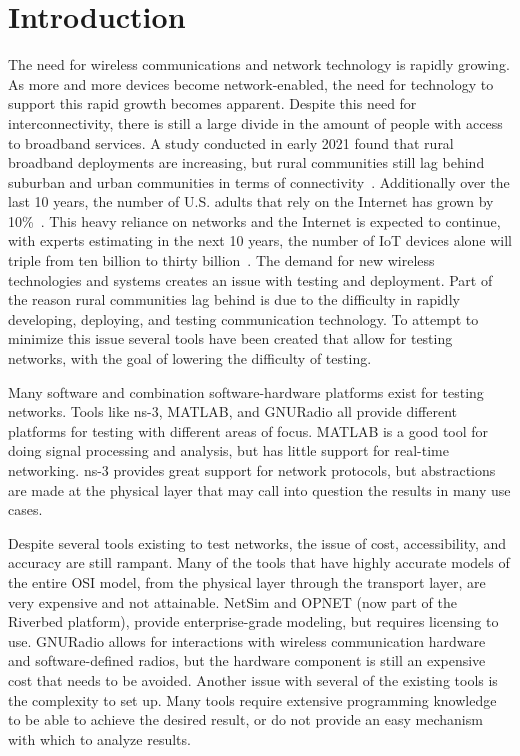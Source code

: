 \chapter{Introduction}
\label{ch:introduction}
The need for wireless communications and network technology is rapidly growing.
As more and more devices become network-enabled, the need for technology to support this rapid growth becomes apparent.
Despite this need for interconnectivity, there is still a large divide in the amount of people with access to broadband services.
A study conducted in early 2021 found that rural broadband deployments are increasing, but rural communities still lag behind suburban and urban communities in terms of connectivity~\cite{digital_divide}.
Additionally over the last 10 years, the number of U.S. adults that rely on the Internet has grown by 10\%~\cite{broadband_factsheet}.
This heavy reliance on networks and the Internet is expected to continue, with experts estimating in the next 10 years, the number of IoT devices alone will triple from ten billion to thirty billion~\cite{iot_spread}.
The demand for new wireless technologies and systems creates an issue with testing and deployment.
Part of the reason rural communities lag behind is due to the difficulty in rapidly developing, deploying, and testing communication technology.
To attempt to minimize this issue several tools have been created that allow for testing networks, with the goal of lowering the difficulty of testing.\par

Many software and combination software-hardware platforms exist for testing networks.
Tools like ns-3, MATLAB, and GNURadio all provide different platforms for testing with different areas of focus.
MATLAB is a good tool for doing signal processing and analysis, but has little support for real-time networking.
ns-3 provides great support for network protocols, but abstractions are made at the physical layer that may call into question the results in many use cases.\par

Despite several tools existing to test networks, the issue of cost, accessibility, and accuracy are still rampant.
Many of the tools that have highly accurate models of the entire OSI model, from the physical layer through the transport layer, are very expensive and not attainable.
NetSim and OPNET (now part of the Riverbed platform), provide enterprise-grade modeling, but requires licensing to use.
GNURadio allows for interactions with wireless communication hardware and software-defined radios, but the hardware component is still an expensive cost that needs to be avoided.
Another issue with several of the existing tools is the complexity to set up.
Many tools require extensive programming knowledge to be able to achieve the desired result, or do not provide an easy mechanism with which to analyze results.\par

